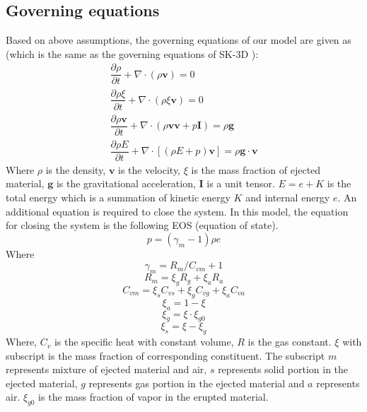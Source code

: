 \documentclass[journal abbreviation, manuscript]{copernicus}
\begin{document}
\subsection{Governing equations}
Based on above assumptions, the governing equations of our model are given as (which is the same as the governing equations of SK-3D \citep{suzuki2005numerical}):
\begin{align}
\dfrac{\partial \rho}{\partial t} + \nabla \cdot \left(\rho \textbf{v}\right) = 0 \label{eq:gov-cs-rho} \\
\dfrac{\partial \rho \xi}{\partial t} + \nabla \cdot \left(\rho \xi \textbf{v}\right) = 0 \label{eq:gov-cs-ks}\\
\dfrac{\partial \rho \textbf{v}}{\partial t} + \nabla \cdot \left(\rho \textbf{v} \textbf{v} + p\textbf{I}\right) = \rho \textbf{g} \label{eq:gov-cs-v} \\
\dfrac{\partial \rho E}{\partial t} + \nabla \cdot \left[\left(\rho E + p \right)\textbf{v}\right] = \rho \textbf{g} \cdot\textbf{v} \label{eq:gov-cs-e}
\end{align}
Where $\rho$ is the density, $\textbf{v}$ is the velocity, $\xi$ is the mass fraction of ejected material, $\textbf{g}$ is the gravitational acceleration, $\textbf{I}$ is a unit tensor.
$E = e + K $ is the total energy which is a summation of kinetic energy $K$ and internal energy $e$.
An additional equation is required to close the system. In this model, the equation for closing the system is the following EOS (equation of state).
\begin{equation}
p = \left(\gamma_m - 1\right)\rho e \label{eq:EOS}
\end{equation}
Where 
\begin{equation}
\gamma_m = R_m/C_{vm} + 1 \label{eq:gov-gm}
\end{equation}
\begin{equation}
R_m = \xi_g R_g + \xi_a R_a  \label{eq:gov-Rm}
\end{equation}
\begin{equation}
C_{vm} = \xi_s C_{vs} + \xi_g C_{vg} + \xi_a C_{va} \label{eq:gov-Cvm}
\end{equation}
\begin{equation}
\xi_a = 1 - \xi \label{eq:gov-na}
\end{equation}
\begin{equation}
\xi_g = \xi \cdot \xi_{g0} \label{eq:gov-ng}
\end{equation}
\begin{equation}
\xi_s = \xi - \xi_g \label{eq:gov-ns}
\end{equation}
Where, $C_v$ is the specific heat with constant volume, $R$ is the gas constant. $\xi$ with subscript is the mass fraction of corresponding constituent. The subscript 
$m$ represents mixture of ejected material and air, $s$ represents solid portion in the ejected material, $g$ represents gas portion in the ejected material and $a$ represents air. $\xi_{g0}$ is the mass fraction of vapor in the erupted material.
\end{document}
